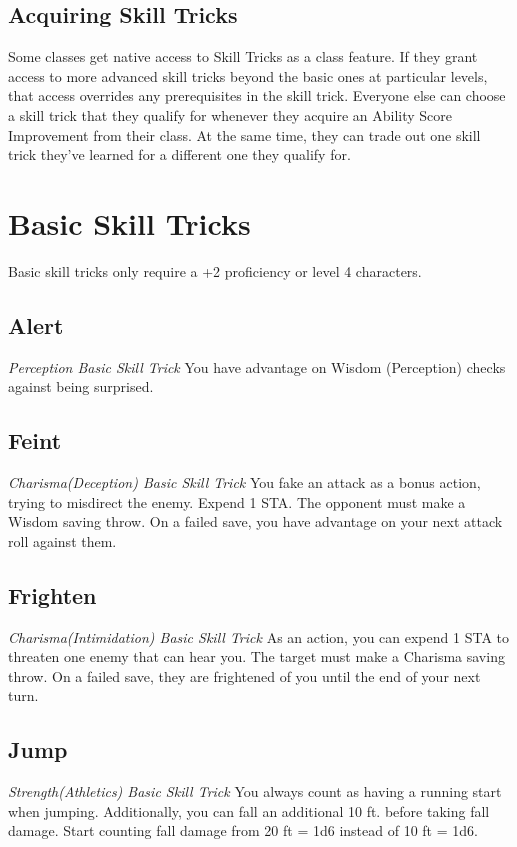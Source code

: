 \subsection{Acquiring Skill Tricks}
\label{subsec:acquiring-skill-tricks}

Some classes get native access to Skill Tricks as a class feature. If they grant access to more advanced skill tricks beyond the basic ones at particular levels, that access overrides any prerequisites in the skill trick. Everyone else can choose a skill trick that they qualify for whenever they acquire an Ability Score Improvement from their class. At the same time, they can trade out one skill trick they've learned for a different one they qualify for.

\section{Basic Skill Tricks}
\label{sec:skill-tricks-basic}

Basic skill tricks only require a +2 proficiency or level 4 characters.

\subsection{Alert}
\textit{Perception Basic Skill Trick}
You have advantage on Wisdom (Perception) checks against being surprised.

\subsection{Feint}
\textit{Charisma(Deception) Basic Skill Trick}
You fake an attack as a bonus action, trying to misdirect the enemy. Expend 1 STA. The opponent must make a Wisdom saving throw. On a failed save, you have advantage on your next attack roll against them.

\subsection{Frighten} \label{st:frighten}
\textit{Charisma(Intimidation) Basic Skill Trick}
As an action, you can expend 1 STA to threaten one enemy that can hear you. The target must make a Charisma saving throw. On a failed save, they are frightened of you until the end of your next turn.

\subsection{Jump}
\textit{Strength(Athletics) Basic Skill Trick}
You always count as having a running start when jumping. Additionally, you can fall an additional 10 ft. before taking fall damage. Start counting fall damage from 20 ft = 1d6 instead of 10 ft = 1d6.

